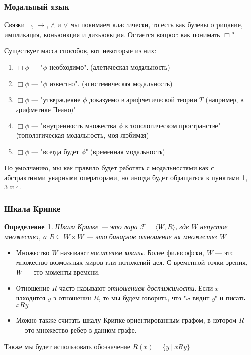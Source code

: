 \documentclass[pdf,utf8,russian,aspectratio=169]{beamer}
\newtheorem{defin}{Определение}
\begin{document}
\begin{frame}
  \frametitle{Модальный язык}
  Связки $\neg$, $\to$, $\land$ и $\lor$ мы понимаем классически, то есть как булевы отрицание, импликация, конъюнкция и
  дизъюнкция. Остается вопрос: как понимать $\Box$?

  Существует масса способов, вот некоторые из них:

  \begin{enumerate}
    \item $\Box \phi$ --- "$\phi$ необходимо". (алетическая модальность)
    \item $\Box \phi$ --- "$\phi$ известно". (эпистемическая модальность)
    \item $\Box \phi$ --- "утверждение $\phi$ доказуемо в арифметической теории $T$ (например, в арифметике Пеано)"
    \item $\Box \phi$ --- "внутренность множества $\phi$ в топологическом пространстве" (топологическая модальность, моя любимая)
    \item $\Box \phi$ --- "всегда будет $\phi$" (временная модальность)
  \end{enumerate}

   По умолчанию, мы как правило будет работать с модальностями как с абстрактными унарными операторами, но иногда будет обращаться к пунктами 1, 3 и 4.
\end{frame}

\begin{frame}
  \frametitle{Шкала Крипке}

  \begin{defin}
    Шкала Крипке --- это пара $\mathcal{F} = \langle W, R \rangle$, где $W$ непустое множество, а $R \subseteq W \times W$ --- это бинарное отношение на множестве $W$
  \end{defin}

\begin{itemize}
  \item Множество $W$ называют \emph{носителем шкалы}. Более философски, $W$ --- это множество возможных миров или положений дел. С временной точки зрения, $W$ --- это моменты времени.
  \item Отношение $R$ часто называют \emph{отношением достижимости}. Если $x$ находится $y$ в отношении $R$, то мы будем говорить, что "$x$ видит $y$" и писать $x R y$
  \item Можно также считать шкалу Крипке ориентированным графом, в котором $R$ --- это множество ребер в данном графе.
\end{itemize}

Также мы будет использовать обозначение $R(x) = \{ y \: | \: x R y \}$
\end{frame}
\end{document}

